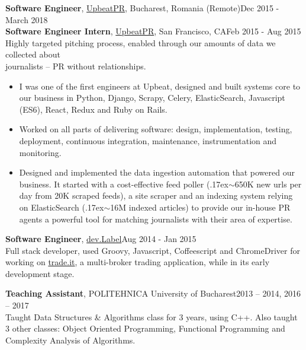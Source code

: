 \documentclass[line, margin]{resume}
\newcommand{\bettertilde}{\raise.17ex\hbox{$\scriptstyle\mathtt{\sim}$}}
\begin{document}
\begin{resume}
\textbf{Software Engineer}, \href{https://www.ycombinator.com/companies/upbeat}{UpbeatPR}, Bucharest, Romania (Remote)\hfill Dec 2015 - March 2018\\
\textbf{Software Engineer Intern}, \href{https://www.ycombinator.com/companies/upbeat}{UpbeatPR}, San Francisco, CA\hfill Feb 2015 - Aug 2015\\
Highly targeted pitching process, enabled through our amounts of data we collected about\\ journalists -- PR without relationships.
\begin{itemize} \itemsep -2pt  %
    \item I was one of the first engineers at Upbeat, designed and built systems core to our business in Python, Django, Scrapy, Celery, ElasticSearch, Javascript (ES6), React, Redux and Ruby on Rails.
    \item Worked on all parts of delivering software: design, implementation, testing, deployment, continuous integration, maintenance, instrumentation and monitoring.
    \item Designed and implemented the data ingestion automation that powered our business. It started with a cost-effective feed poller (\bettertilde650K new urls per day from 20K scraped feeds), a site scraper and an indexing system relying on ElasticSearch (\bettertilde16M indexed articles) to provide our in-house PR agents a powerful tool for matching journalists with their area of expertise.
\end{itemize}

\textbf{Software Engineer}, \href{http://devlabel.com/}{dev.Label}\hfill Aug 2014 - Jan 2015\\
Full stack developer, used Groovy, Javascript, Coffeescript and ChromeDriver for working on \href{https://www.trade.it/}{trade.it}, a multi-broker trading application, while in its early development stage.

\textbf{Teaching Assistant}, POLITEHNICA University of Bucharest\hfill 2013 -- 2014, 2016 -- 2017\\
Taught Data Structures \& Algorithms class for 3 years, using C++. Also taught 3 other classes: Object Oriented Programming, Functional Programming and Complexity Analysis of Algorithms.


\end{resume}
\end{document}
